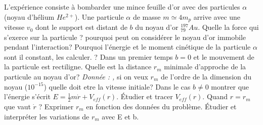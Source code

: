 \begin{Exercise}[title=(*) Diffusion de Rutherford]
	L'expérience consiste à bombarder une mince feuille d'or avec des particules
    $\alpha$ (noyau d'hélium $He^{2+}$). Une particule $\alpha$ de masse $m \simeq 4m_p$ arrive
    avec une vitesse $v_0$ dont le support est distant de $b$ du noyau d'or
    $^{197}_{79}Au$.
    \Question Quelle la force qui s'exerce sur la particule ? pourquoi peut
    on considérer le noyau d'or immobile pendant l'interaction?
    \Question Pourquoi l'énergie et le moment cinétique de la particule $\alpha$ sont
    il constant, les calculer. ?
    \Question Dans un premier temps $b=0$ et le mouvement de la particule est
    rectiligne. Quelle est la distance $r_m$ minimale d'approche de la particule
    au noyau d'or?
    \emph{Donnée : ,}
	si on veux $r_m$ de l'ordre de la dimension du noyau ($10^{-15}$) quelle
    doit etre la vitesse initiale?
    \Question Dans le cas $b\neq 0$ montrer que l'énergie s'écrit $E=
    \frac{1}{2}m\dot{r}+V_{eff}(r)$. Étudier et tracer $V_{eff}(r)$. Quand
    $r=r_m$ que vaut $\dot{r}$ ? Exprimer $r_m$ en fonction des données du
    problème. Étudier et interpréter les variations de $r_m$ avec E et b.
\end{Exercise}
\begin{Answer}
	~
\end{Answer}
